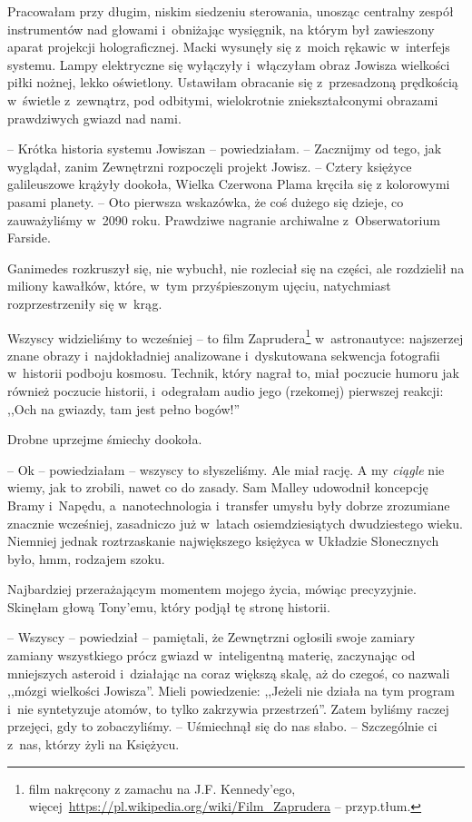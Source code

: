 \documentclass[oneside,polish,11pt,sfheadings]{mwbk}
\begin{document}
Pracowałam przy długim, niskim siedzeniu sterowania, unosząc centralny
zespół instrumentów nad głowami i~obniżając wysięgnik, na którym był
zawieszony aparat projekcji holograficznej. Macki wysunęły się z~moich
rękawic w~interfejs systemu. Lampy elektryczne się wyłączyły i~włączyłam
obraz Jowisza wielkości piłki nożnej, lekko oświetlony. Ustawiłam
obracanie się z~przesadzoną prędkością w~świetle z~zewnątrz, pod
odbitymi, wielokrotnie zniekształconymi obrazami prawdziwych gwiazd nad
nami.

-- Krótka historia systemu Jowiszan -- powiedziałam. -- Zacznijmy od tego,
jak wyglądał, zanim Zewnętrzni rozpoczęli projekt Jowisz. -- Cztery
księżyce galileuszowe krążyły dookoła, Wielka Czerwona Plama kręciła się
z kolorowymi pasami planety. -- Oto pierwsza wskazówka, że coś dużego się
dzieje, co zauważyliśmy w~2090 roku. Prawdziwe nagranie archiwalne z~Obserwatorium Farside.

Ganimedes rozkruszył się, nie wybuchł, nie rozleciał się na części, ale
rozdzielił na miliony kawałków, które, w~tym przyśpieszonym ujęciu,
natychmiast rozprzestrzeniły się w~krąg.

Wszyscy widzieliśmy to wcześniej -- to film Zaprudera\footnote{ film nakręcony
z zamachu na J.F. Kennedy'ego,
więcej~\url{https://pl.wikipedia.org/wiki/Film\_Zaprudera} -- przyp.tłum.} w~astronautyce: najszerzej znane obrazy i~najdokładniej
analizowane i~dyskutowana sekwencja fotografii w~historii podboju
kosmosu. Technik, który nagrał to, miał poczucie humoru jak również
poczucie historii, i~odegrałam audio jego (rzekomej) pierwszej reakcji:
,,Och na gwiazdy, tam jest pełno bogów!''

Drobne uprzejme śmiechy dookoła. 

-- Ok -- powiedziałam -- wszyscy to
słyszeliśmy. Ale miał rację. A my \textit{ciągle} nie wiemy, jak to
zrobili, nawet co do zasady. Sam Malley udowodnił koncepcję Bramy i~Napędu, a~nanotechnologia i~transfer umysłu były dobrze zrozumiane
znacznie wcześniej, zasadniczo już w~latach osiemdziesiątych
dwudziestego wieku. Niemniej jednak roztrzaskanie największego księżyca
w Układzie Słonecznych było, hmm, rodzajem szoku.

Najbardziej przerażającym momentem mojego życia, mówiąc precyzyjnie.
Skinęłam głową Tony'emu, który podjął tę stronę historii.

-- Wszyscy -- powiedział -- pamiętali, że Zewnętrzni ogłosili swoje zamiary
zamiany wszystkiego prócz gwiazd w~inteligentną materię, zaczynając od
mniejszych asteroid i~działając na coraz większą skalę, aż do czegoś, co
nazwali ,,mózgi wielkości Jowisza''. Mieli powiedzenie: ,,Jeżeli nie
działa na tym program i~nie syntetyzuje atomów, to tylko zakrzywia
przestrzeń''. Zatem byliśmy raczej przejęci, gdy to zobaczyliśmy. -- Uśmiechnął się do nas słabo. -- Szczególnie ci z~nas, którzy żyli na
Księżycu.
\end{document}
